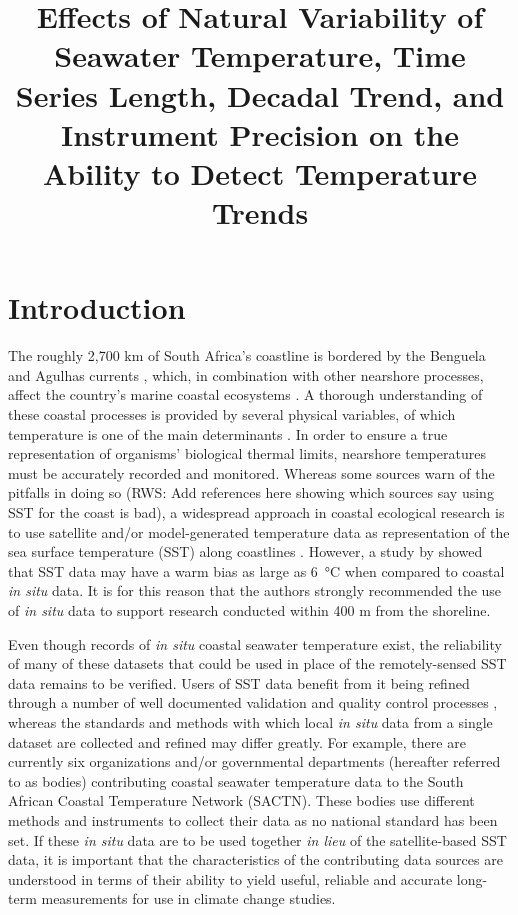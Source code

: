 \documentclass{ametsoc}
\title{Effects of Natural Variability of Seawater Temperature, Time Series Length, Decadal Trend, and Instrument Precision on the Ability to Detect Temperature Trends}
\affiliation{Department of Biodiversity and Conservation Biology, University of the Western Cape, Bellville, Republic of South Africa}
\begin{document}
\maketitle

\section{Introduction}
The roughly 2,700 km of South Africa's coastline is bordered by the Benguela and Agulhas currents \citep[e.g.][]{Roberts2005,Hutchings2009}, which, in combination with other nearshore processes, affect the country's marine coastal ecosystems \citep{Santos2012a}. A thorough understanding of these coastal processes is provided by several physical variables, of which temperature is one of the main determinants \citep[e.g.][]{Blanchette2008, Tittensor2010, Couce2012}. In order to ensure a true representation of organisms' biological thermal limits, nearshore temperatures must be accurately recorded and monitored. Whereas some sources warn of the pitfalls in doing so (RWS: Add references here showing which sources say using SST for the coast is bad), a widespread approach in coastal ecological research is to use satellite and/or model-generated temperature data as representation of the sea surface temperature (SST) along coastlines \citep[e.g.][]{Blanchette2008, Broitman2008a, Tyberghein2012}. However, a study by \citet{Smit2013} showed that SST data may have a warm bias as large as \SI{6}{\degreeCelsius} when compared to coastal \emph{in situ} data. It is for this reason that the authors strongly recommended the use of \emph{in situ} data to support research conducted within 400 m from the shoreline.

Even though records of \emph{in situ} coastal seawater temperature exist, the reliability of many of these datasets that could be used in place of the remotely-sensed SST data remains to be verified. Users of SST data benefit from it being refined through a number of well documented validation and quality control processes \citep[e.g.][]{Reynolds1994, Brown1999, Martin2012}, whereas the standards and methods with which local \emph{in situ} data from a single dataset are collected and refined may differ greatly. For example, there are currently six organizations and/or governmental departments (hereafter referred to as bodies) contributing coastal seawater temperature data to the South African Coastal Temperature Network (SACTN). These bodies use different methods and instruments to collect their data as no national standard has been set. If these \emph{in situ} data are to be used together \emph{in lieu} of the satellite-based SST data, it is important that the characteristics of the contributing data sources are understood in terms of their ability to yield useful, reliable and accurate long-term measurements for use in climate change studies.
\end{document}
